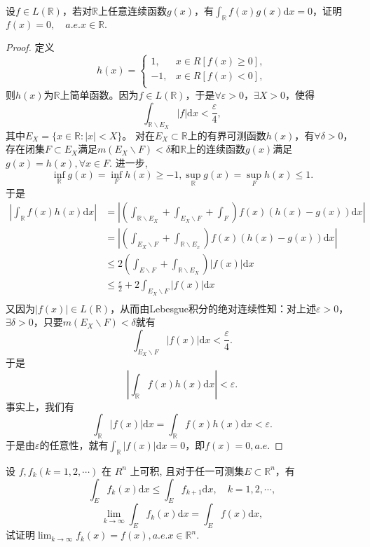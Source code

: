 \begin{exercise}
设$f\in L(\mathbb{R})$，若对$\mathbb{R}$上任意连续函数$g(x)$，有$\int_{\mathbb{R}}f(x)g(x)\mathrm{d}x=0$，证明$f(x)=0,\quad a.e.x\in\mathbb{R}.$
\end{exercise}

\begin{proof}
  定义
\begin{equation}
h(x)=
\begin{cases}
1,&x\in R[f(x)\geq0],\\
-1,&x\in R[f(x)<0],\\
\end{cases}
\end{equation}
则$h(x)$为$\mathbb{R}$上简单函数。因为$f\in L(\mathbb{R})$，于是$\forall\varepsilon>0$，$\exists X>0$，使得$$\int_{\mathbb{R}\backslash E_X}|f|\mathrm{d}x<\frac{\varepsilon}{4},$$
其中$E_X=\{x\in\mathbb{R}:|x|<X\}$。
对在$E_X\subset\mathbb{R}$上的有界可测函数$h(x)$，有$\forall\delta>0$，存在闭集$F\subset E_X$满足$m(E_X\backslash F)<\delta$和$\mathbb{R}$上的连续函数$g(x)$满足$g(x)=h(x),\forall x\in F$. 进一步,
$$\inf_{\mathbb{R}}g(x)=\inf_Fh(x)\geq-1,\sup_{\mathbb{R}}g(x)=\sup_Fh(x)\leq1.$$
于是
\begin{align*}
|\int_{\mathbb{R}}f(x)h(x)\mathrm{d}x|&=|(\int_{\mathbb{R}\backslash E_X}+\int_{E_X\backslash F}+\int_F)f(x)(h(x)-g(x))\mathrm{d}x|\\
&=|(\int_{E_X\backslash F}+\int_{\mathbb{R}\backslash E_x})f(x)(h(x)-g(x))\mathrm{d}x|\\
&\leq2(\int_{E\backslash F}+\int_{\mathbb{R}\backslash E_X})|f(x)|\mathrm{d}x\\
&\leq\frac{\varepsilon}{2}+2\int_{E_X\backslash F}|f(x)|\mathrm{d}x\\
\end{align*}
又因为$|f(x)|\in L(\mathbb{R})$，从而由Lebesgue积分的绝对连续性知：对上述$\varepsilon>0$，$\exists\delta>0$，只要$m(E_X\backslash F)<\delta$就有
$$\int_{E_X\backslash F}|f(x)|\mathrm{d}x<\frac{\varepsilon}{4}.$$
于是$$|\int_{\mathbb{R}}f(x)h(x)\mathrm{d}x|<\varepsilon.$$
事实上，我们有$$\int_{\mathbb{R}}|f(x)|\mathrm{d}x=\int_{\mathbb{R}}f(x)h(x)\mathrm{d}x<\varepsilon.$$
于是由$\varepsilon$的任意性，就有$\int_{\mathbb{R}}|f(x)|\mathrm{d}x=0$，即$f(x)=0,a.e.$
\end{proof}

\begin{exercise}
设 $f,f_k(k=1,2,\cdots)$ 在 $R^n$ 上可积, 且对于任一可测集$E\subset\mathbb{R}^n$，有
$$\int_Ef_k(x)\mathrm{d}x\leq\int_Ef_{k+1}\mathrm{d}x,\quad k=1,2,\cdots,$$
$$\lim_{k\to\infty}\int_Ef_k(x)\mathrm{d}x=\int_Ef(x)\mathrm{d}x,$$
试证明$\lim_{k\to\infty}f_k(x)=f(x),a.e.x\in\mathbb{R}^n.$
\end{exercise}


